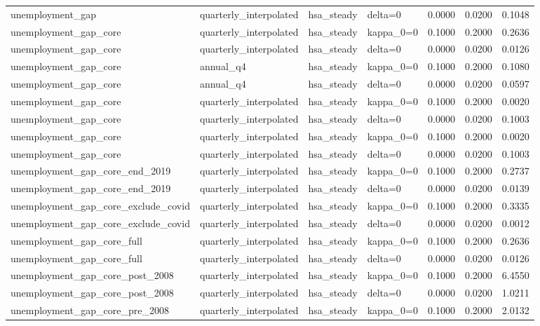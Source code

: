 \begin{tabular}{llllrrr}
unemployment\_gap & quarterly\_interpolated & hsa\_steady & delta=0 & 0.0000 & 0.0200 & 0.1048 \\
unemployment\_gap\_core & quarterly\_interpolated & hsa\_steady & kappa\_0=0 & 0.1000 & 0.2000 & 0.2636 \\
unemployment\_gap\_core & quarterly\_interpolated & hsa\_steady & delta=0 & 0.0000 & 0.0200 & 0.0126 \\
unemployment\_gap\_core & annual\_q4 & hsa\_steady & kappa\_0=0 & 0.1000 & 0.2000 & 0.1080 \\
unemployment\_gap\_core & annual\_q4 & hsa\_steady & delta=0 & 0.0000 & 0.0200 & 0.0597 \\
unemployment\_gap\_core & quarterly\_interpolated & hsa\_steady & kappa\_0=0 & 0.1000 & 0.2000 & 0.0020 \\
unemployment\_gap\_core & quarterly\_interpolated & hsa\_steady & delta=0 & 0.0000 & 0.0200 & 0.1003 \\
unemployment\_gap\_core & quarterly\_interpolated & hsa\_steady & kappa\_0=0 & 0.1000 & 0.2000 & 0.0020 \\
unemployment\_gap\_core & quarterly\_interpolated & hsa\_steady & delta=0 & 0.0000 & 0.0200 & 0.1003 \\
unemployment\_gap\_core\_end\_2019 & quarterly\_interpolated & hsa\_steady & kappa\_0=0 & 0.1000 & 0.2000 & 0.2737 \\
unemployment\_gap\_core\_end\_2019 & quarterly\_interpolated & hsa\_steady & delta=0 & 0.0000 & 0.0200 & 0.0139 \\
unemployment\_gap\_core\_exclude\_covid & quarterly\_interpolated & hsa\_steady & kappa\_0=0 & 0.1000 & 0.2000 & 0.3335 \\
unemployment\_gap\_core\_exclude\_covid & quarterly\_interpolated & hsa\_steady & delta=0 & 0.0000 & 0.0200 & 0.0012 \\
unemployment\_gap\_core\_full & quarterly\_interpolated & hsa\_steady & kappa\_0=0 & 0.1000 & 0.2000 & 0.2636 \\
unemployment\_gap\_core\_full & quarterly\_interpolated & hsa\_steady & delta=0 & 0.0000 & 0.0200 & 0.0126 \\
unemployment\_gap\_core\_post\_2008 & quarterly\_interpolated & hsa\_steady & kappa\_0=0 & 0.1000 & 0.2000 & 6.4550 \\
unemployment\_gap\_core\_post\_2008 & quarterly\_interpolated & hsa\_steady & delta=0 & 0.0000 & 0.0200 & 1.0211 \\
unemployment\_gap\_core\_pre\_2008 & quarterly\_interpolated & hsa\_steady & kappa\_0=0 & 0.1000 & 0.2000 & 2.0132 \\

\end{tabular}
